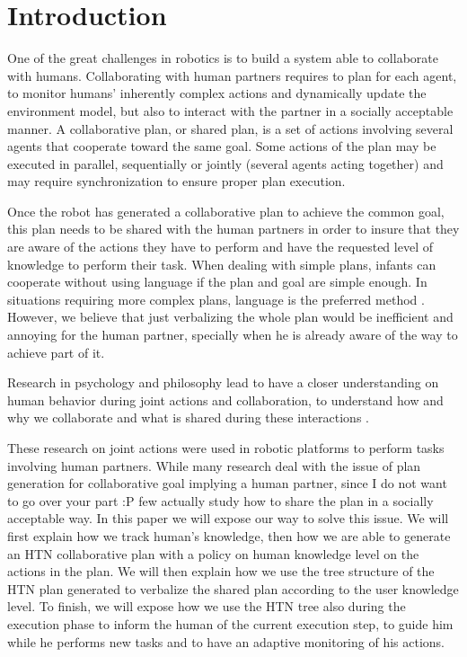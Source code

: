 \documentclass{llncs}
\begin{document}
\section{Introduction}
One of the great challenges in robotics is to build a system able to collaborate with humans. Collaborating with human partners requires to plan for each agent, to monitor humans' inherently complex actions and dynamically update the environment model, but also to interact with the partner in a socially acceptable manner.
A collaborative plan, or shared plan, is a set of actions involving several agents that cooperate toward the same goal.
Some actions of the plan may be executed in parallel, sequentially or jointly (several agents acting together) and may require synchronization to ensure proper plan execution.
%

Once the robot has generated a collaborative plan to achieve the common goal, this plan needs to be shared with the human partners in order to insure that they are aware of the actions they have to perform and have the requested level of knowledge to perform their task. When dealing with simple plans, infants can cooperate without using language if the plan and goal are simple enough. In situations requiring more complex plans, language is the preferred method \cite{Warneken2006,Warneken2007}. However, we believe that just verbalizing the whole plan would be inefficient and 
annoying for the human partner, specially when he is already aware of the way to achieve part of it.  %


Research in psychology and philosophy lead to have a closer understanding on human behavior during joint actions and collaboration, to understand how \cite{tomasello2005} and why \cite{tomasello2009} we collaborate and what is shared during these interactions \cite{Butterfill2011}.

These research on joint actions were used in robotic platforms to perform tasks involving human partners. While many research deal with the issue of plan generation for collaborative goal implying a human partner,
since I do not want to go over your part :P%
 few actually study how to share the plan in a socially acceptable way.
In this paper we will expose our way to solve this issue. We will first explain how we track human's knowledge, then how we are able to generate an HTN collaborative plan with a policy on human knowledge level on the actions in the plan. We will then explain how we use the tree structure of the HTN  plan generated to verbalize the shared plan according to the user knowledge level. To finish, we will expose how we use the HTN tree also during the execution phase to inform the human of the current execution step, to guide him while he performs new tasks and to have an adaptive monitoring of his actions. %
\end{document}
